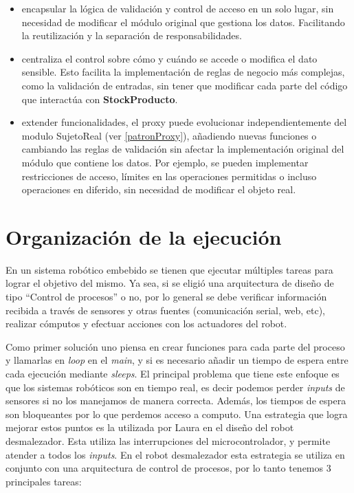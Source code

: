 \begin{itemize}
    \item encapsular la lógica de validación y control de acceso en un solo lugar, sin necesidad de modificar el módulo original que gestiona los datos. Facilitando la reutilización y la separación de responsabilidades.

    \item centraliza el control sobre cómo y cuándo se accede o modifica el dato sensible. Esto facilita la implementación de reglas de negocio más complejas, como la validación de entradas, sin tener que modificar cada parte del código que interactúa con \textbf{StockProducto}.

    \item extender funcionalidades, el proxy puede evolucionar independientemente del modulo SujetoReal (ver \ref{patronProxy}), añadiendo nuevas funciones o cambiando las reglas de validación sin afectar la implementación original del módulo que contiene los datos. Por ejemplo, se pueden implementar restricciones de acceso, límites en las operaciones permitidas o incluso operaciones en diferido, sin necesidad de modificar el objeto real.
\end{itemize}

\section{Organización de la ejecución}

En un sistema robótico embebido se tienen que ejecutar múltiples tareas para lograr el objetivo del mismo. Ya sea, si se eligió una arquitectura de diseño de tipo ``Control de procesos'' o no, por lo general se debe verificar información recibida a través de sensores y otras fuentes (comunicación serial, web, etc), realizar cómputos y efectuar acciones con los actuadores del robot.

Como primer solución uno piensa en crear funciones para cada parte del proceso y llamarlas en \textit{loop} en el \textit{main}, y si es necesario añadir un tiempo de espera entre cada ejecución mediante \textit{sleeps}. El principal problema que tiene este enfoque es que los sistemas robóticos son en tiempo real, es decir podemos perder \textit{inputs} de sensores si no los manejamos de manera correcta. Además, los tiempos de espera son bloqueantes por lo que perdemos acceso a computo. Una estrategia que logra mejorar estos puntos es la utilizada por Laura en el diseño del robot desmalezador. Esta utiliza las interrupciones del microcontrolador, y permite atender a todos los \textit{inputs}. En el robot desmalezador esta estrategia se utiliza en conjunto con una arquitectura de control de procesos, por lo tanto tenemos 3 principales tareas:

